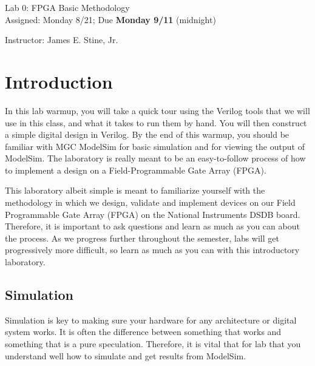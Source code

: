 \documentclass{article}
\newcommand{\myassignment}{Lab 0: FPGA Basic Methodology}
\newcommand{\myduedate}{Assigned: Monday 8/21; Due \textbf{Monday 9/11} (midnight)}
\newcommand{\myinstructor}{Instructor: James E. Stine, Jr.}
\begin{document}
\begin{center}
  {\huge \myassignment} \\
  {\large \myduedate} \\
  \begin{flushright}
  \myinstructor \\
  \end{flushright}
\end{center}

\section{Introduction}

In this lab warmup, you will take a quick tour using the 
Verilog tools that we will use
in this class, and what it takes to run them by hand. You will then
construct a simple digital design in Verilog.
By the end of this warmup, you should be
familiar with MGC ModelSim for basic simulation and for viewing the
output of ModelSim. The laboratory is really meant to be an
easy-to-follow process of how to implement a design on a
Field-Programmable Gate Array (FPGA).

This laboratory albeit simple
is meant to familiarize yourself with the methodology in which we
design, validate and implement devices on our Field Programmable Gate
Array (FPGA) on the National Instruments DSDB board.  Therefore, it is
important to ask questions and learn as much as you can about the
process.  As we progress further throughout the semester, labs will
get progressively more difficult, so learn as much as you can with
this introductory laboratory.

\subsection{Simulation}

Simulation is key to making sure your hardware for any architecture or
digital system works.  It is often the difference between something
that works and something that is a pure speculation.  Therefore, it is
vital that for lab that you understand well how to simulate and get
results from ModelSim.
\end{document}
